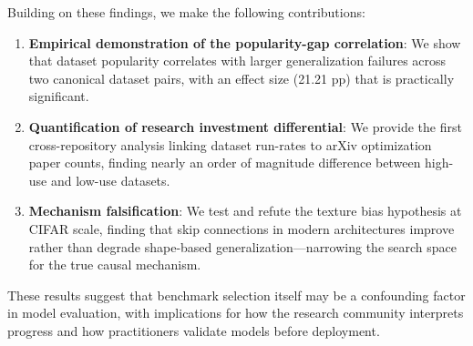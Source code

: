 Building on these findings, we make the following contributions:

\begin{enumerate}
    \item \textbf{Empirical demonstration of the popularity-gap correlation}: We show that dataset popularity correlates with larger generalization failures across two canonical dataset pairs, with an effect size (21.21 pp) that is practically significant.

    \item \textbf{Quantification of research investment differential}: We provide the first cross-repository analysis linking dataset run-rates to arXiv optimization paper counts, finding nearly an order of magnitude difference between high-use and low-use datasets.

    \item \textbf{Mechanism falsification}: We test and refute the texture bias hypothesis at CIFAR scale, finding that skip connections in modern architectures improve rather than degrade shape-based generalization---narrowing the search space for the true causal mechanism.
\end{enumerate}

These results suggest that benchmark selection itself may be a confounding factor in model evaluation, with implications for how the research community interprets progress and how practitioners validate models before deployment.
